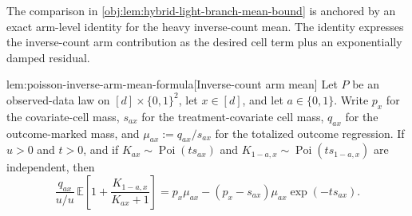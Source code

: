 \documentclass[11pt]{article}
\begin{document}
The comparison in \cref{obj:lem:hybrid-light-branch-mean-bound} is anchored by an exact arm-level identity for the heavy inverse-count mean. The identity expresses the inverse-count arm contribution as the desired cell term plus an exponentially damped residual.

\begin{lemmav}{lem:poisson-inverse-arm-mean-formula}[Inverse-count arm mean]
Let \(P\) be an observed-data law on \([d]\times\{0,1\}^2\), let \(x\in[d]\), and let \(a\in\{0,1\}\). Write \(p_x\) for the covariate-cell mass, \(s_{ax}\) for the treatment-covariate cell mass, \(q_{ax}\) for the outcome-marked mass, and \(\mu_{ax}:=q_{ax}/s_{ax}\) for the totalized outcome regression. If \(u>0\) and \(t>0\), and if \(K_{ax}\sim\operatorname{Poi}(t s_{ax})\) and \(K_{1-a,x}\sim\operatorname{Poi}(t s_{1-a,x})\) are independent, then
\[
\frac{q_{ax}}{u/u}\,
\mathbb E\!\left[1+\frac{K_{1-a,x}}{K_{ax}+1}\right]
=
p_x\mu_{ax}-(p_x-s_{ax})\mu_{ax}\exp(-t s_{ax}).
\]
\end{lemmav}
\end{document}
